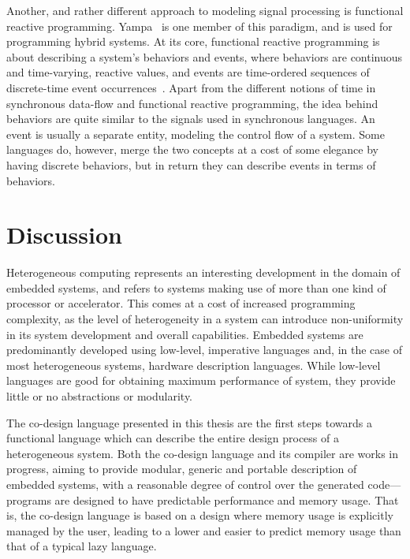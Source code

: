 \documentclass[../paper.tex]{subfiles}
\begin{document}
Another, and rather different approach to modeling signal processing is functional reactive programming. Yampa~\cite{yampa2003} is one member of this paradigm, and is used for programming hybrid systems. At its core, functional reactive programming is about describing a system's behaviors and events, where behaviors are continuous and time-varying, reactive values, and events are time-ordered sequences of discrete-time event occurrences~\cite{nilsson2002}. Apart from the different notions of time in synchronous data-flow and functional reactive programming, the idea behind behaviors are quite similar to the signals used in synchronous languages. An event is usually a separate entity, modeling the control flow of a system. Some languages do, however, merge the two concepts at a cost of some elegance by having discrete behaviors, but in return they can describe events in terms of behaviors.

\section{Discussion}
\label{disc}


Heterogeneous computing represents an interesting development in the domain of embedded systems, and refers to systems making use of more than one kind of processor or accelerator. This comes at a cost of increased programming complexity, as the level of heterogeneity in a system can introduce non-uniformity in its system development and overall capabilities. Embedded systems are predominantly developed using low-level, imperative languages and, in the case of most heterogeneous systems, hardware description languages. While low-level languages are good for obtaining maximum performance of system, they provide little or no abstractions or modularity. 

The co-design language presented in this thesis are the first steps towards a functional language which can describe the entire design process of a heterogeneous system. Both the co-design language and its compiler are works in progress, aiming to provide modular, generic and portable description of embedded systems, with a reasonable degree of control over the generated code---programs are designed to have predictable performance and memory usage. That is, the co-design language is based on a design where memory usage is explicitly managed by the user, leading to a lower and easier to predict memory usage than that of a typical lazy language.
\end{document}
